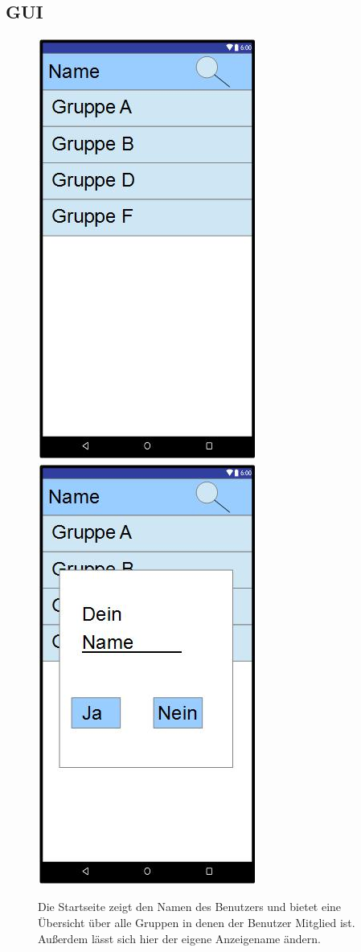 \documentclass{scrartcl}
\begin{document}
	\subsection{GUI}
	\begin{figure}[h]
		\includegraphics[width=.5\textwidth]{GUI_Start.jpg}
		\includegraphics[width=.5\textwidth]{GUI_changeName.jpg}
		\caption{Die Startseite zeigt den Namen des Benutzers und bietet eine Übersicht über alle Gruppen in denen der Benutzer \gls{Mitglied} ist. Außerdem lässt sich hier der eigene Anzeigename ändern.}
	\end{figure}
	
\end{document}
